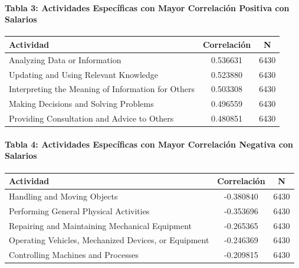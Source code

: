 \documentclass{article}
\theoremstyle{remark}
\theoremstyle{definition}
\begin{document}
\begin{tcolorbox}
\paragraph{Tabla 3: Actividades Específicas con Mayor Correlación Positiva con Salarios}
\begin{table}[H]
\centering
\begin{tabular}{|l|c|c|}
\hline
\textbf{Actividad} & \textbf{Correlación} & \textbf{N} \\
\hline
Analyzing Data or Information & 0.536631 & 6430 \\
Updating and Using Relevant Knowledge & 0.523880 & 6430 \\
Interpreting the Meaning of Information for Others & 0.503308 & 6430 \\
Making Decisions and Solving Problems & 0.496559 & 6430 \\
Providing Consultation and Advice to Others & 0.480851 & 6430 \\
\hline
\end{tabular}
\end{table}

\paragraph{Tabla 4: Actividades Específicas con Mayor Correlación Negativa con Salarios}
\begin{table}[H]
\centering
\begin{tabular}{|l|c|c|}
\hline
\textbf{Actividad} & \textbf{Correlación} & \textbf{N} \\
\hline
Handling and Moving Objects & -0.380840 & 6430 \\
Performing General Physical Activities & -0.353696 & 6430 \\
Repairing and Maintaining Mechanical Equipment & -0.265365 & 6430 \\
Operating Vehicles, Mechanized Devices, or Equipment & -0.246369 & 6430 \\
Controlling Machines and Processes & -0.209815 & 6430 \\
\hline
\end{tabular}
\end{table}


\end{tcolorbox}
\end{document}
